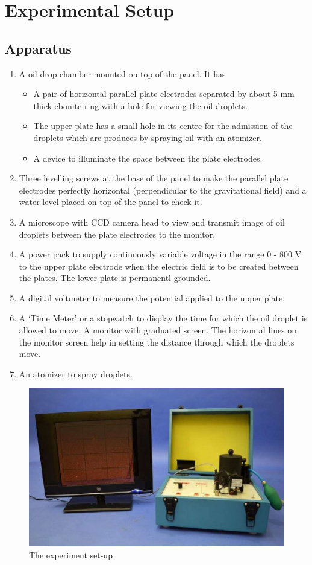 \section{Experimental Setup}

\subsection*{Apparatus}

\begin{enumerate}
    \item A oil drop chamber mounted on top of the panel. It has
    \begin{itemize}
        \item A pair of horizontal parallel plate electrodes
        separated by about 5 mm thick ebonite ring
        with a hole for viewing the oil droplets.
        \item The upper plate has a small hole in its centre for the admission of the droplets which are
        produces by spraying oil with an atomizer.
        \item A device to illuminate the space between the
        plate electrodes.
    \end{itemize}
    \item Three levelling screws at the base of the panel to
    make the parallel plate electrodes perfectly horizontal (perpendicular to the gravitational field) and a
    water-level placed on top of the panel to check it.
    \item A microscope with CCD camera head to view and
    transmit image of oil droplets between the plate electrodes to the monitor.
    \item A power pack to supply continuously variable voltage in the range 0 - 800 V to the upper plate electrode when the electric field is to be created between the plates.
    The lower plate is permanentl grounded.
    \item A digital voltmeter to measure the potential applied
    to the upper plate.
    \item A ‘Time Meter’ or a stopwatch to display the time for which the oil droplet is allowed to move.
    A monitor with graduated screen. The horizontal lines on the monitor screen help in setting the distance through which the droplets move.
    \item An atomizer to spray droplets.
\end{enumerate}

\begin{figure}[H]
    \centering
    \includegraphics[width=.8\columnwidth]{images/2.png}
    \caption{The experiment set-up}
    \label{2}
\end{figure}